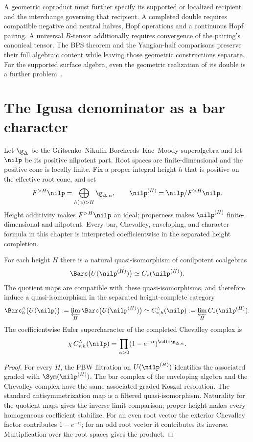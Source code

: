 A geometric coproduct must further specify its supported or localized recipient and the interchange governing that recipient.
A completed double requires compatible negative and neutral halves, Hopf operations and a continuous Hopf pairing.
A universal $R$-tensor additionally requires convergence of the pairing's canonical tensor.
The BPS theorem and the Yangian-half comparisons preserve their full algebraic content while leaving those geometric constructions separate.
For the supported surface algebra, even the geometric realization of its double is a further problem~\cite[Introduction, ``Representations'']{DPPSSV}.

\chapter{The Igusa denominator as a bar character}
Let $\g_\Delta$ be the Gritsenko--Nikulin Borcherds--Kac--Moody superalgebra and let $\nilp$ be its positive nilpotent part. Root spaces are finite-dimensional and the positive cone is locally finite. Fix a proper integral height $h$ that is positive on the effective root cone, and set
\[
 F^{>H}\nilp=\bigoplus_{h(\alpha)>H}\g_{\Delta,\alpha},
 \qquad
 \nilp^{(H)}=\nilp/F^{>H}\nilp.
\]
Height additivity makes $F^{>H}\nilp$ an ideal; properness makes $\nilp^{(H)}$ finite-dimensional and nilpotent. Every bar, Chevalley, enveloping, and character formula in this chapter is interpreted coefficientwise in the separated height completion.

\begin{theorem}
For each height $H$ there is a natural quasi-isomorphism of conilpotent coalgebras
\[
 \Barc\bigl(U(\nilp^{(H)})\bigr)\simeq C_*(\nilp^{(H)}).
\]
The quotient maps are compatible with these quasi-isomorphisms, and therefore induce a quasi-isomorphism in the separated height-complete category
\[
 \Barc_h^\wedge\bigl(U(\nilp)\bigr):=\varprojlim_H\Barc\bigl(U(\nilp^{(H)})\bigr)
 \simeq
 C_{*,h}^\wedge(\nilp):=\varprojlim_H C_*(\nilp^{(H)}).
\]
The coefficientwise Euler supercharacter of the completed Chevalley complex is
\[
 \chi\,C_{*,h}^\wedge(\nilp)
 =\prod_{\alpha>0}(1-e^{-\alpha})^{\sdim\g_{\Delta,\alpha}}.
\]
\end{theorem}
\begin{proof}
For every $H$, the PBW filtration on $U(\nilp^{(H)})$ identifies the associated graded with $\Sym(\nilp^{(H)})$. The bar complex of the enveloping algebra and the Chevalley complex have the same associated-graded Koszul resolution. The standard antisymmetrization map is a filtered quasi-isomorphism. Naturality for the quotient maps gives the inverse-limit comparison; proper height makes every homogeneous coefficient stabilize. For an even root vector the exterior Chevalley factor contributes $1-e^{-\alpha}$; for an odd root vector it contributes its inverse. Multiplication over the root spaces gives the product.
\end{proof}

